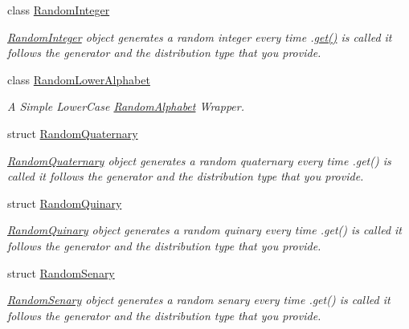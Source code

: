\begin{DoxyCompactItemize}
class \hyperlink{classtestcaser_1_1maker_1_1types_1_1RandomInteger}{Random\+Integer}
\begin{DoxyCompactList}\small\item\em \hyperlink{classtestcaser_1_1maker_1_1types_1_1RandomInteger}{Random\+Integer} object generates a random integer every time .\hyperlink{classtestcaser_1_1maker_1_1types_1_1RandomInteger_a3b7754ca1c579f58b959ca6adb483a51}{get()} is called it follows the generator and the distribution type that you provide. \end{DoxyCompactList}\item 
class \hyperlink{classtestcaser_1_1maker_1_1types_1_1RandomLowerAlphabet}{Random\+Lower\+Alphabet}
\begin{DoxyCompactList}\small\item\em A Simple Lower\+Case \hyperlink{classtestcaser_1_1maker_1_1types_1_1RandomAlphabet}{Random\+Alphabet} Wrapper. \end{DoxyCompactList}\item 
struct \hyperlink{structtestcaser_1_1maker_1_1types_1_1RandomQuaternary}{Random\+Quaternary}
\begin{DoxyCompactList}\small\item\em \hyperlink{structtestcaser_1_1maker_1_1types_1_1RandomQuaternary}{Random\+Quaternary} object generates a random quaternary every time .get() is called it follows the generator and the distribution type that you provide. \end{DoxyCompactList}\item 
struct \hyperlink{structtestcaser_1_1maker_1_1types_1_1RandomQuinary}{Random\+Quinary}
\begin{DoxyCompactList}\small\item\em \hyperlink{structtestcaser_1_1maker_1_1types_1_1RandomQuinary}{Random\+Quinary} object generates a random quinary every time .get() is called it follows the generator and the distribution type that you provide. \end{DoxyCompactList}\item 
struct \hyperlink{structtestcaser_1_1maker_1_1types_1_1RandomSenary}{Random\+Senary}
\begin{DoxyCompactList}\small\item\em \hyperlink{structtestcaser_1_1maker_1_1types_1_1RandomSenary}{Random\+Senary} object generates a random senary every time .get() is called it follows the generator and the distribution type that you provide. \end{DoxyCompactList}\item 

\end{DoxyCompactItemize}

